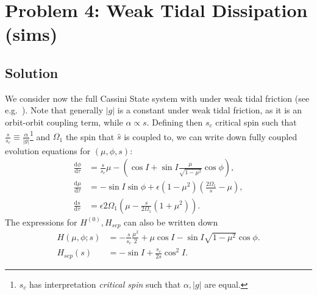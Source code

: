 \documentclass[
        fleqn,
        usenatbib,
    ]{mnras}
\newcommand*{\rd}[2]{\frac{\mathrm{d}#1}{\mathrm{d}#2}}
\newcommand*{\abs}[1]{\left|#1\right|}
\newcommand*{\p}[1]{\left(#1\right)}
\begin{document}
\section{Problem 4: Weak Tidal Dissipation (sims)}\label{s:p4}

\subsection{Solution}

We consider now the full Cassini State system with under weak tidal friction
(see e.g.\ \cite{lai2012}). Note that generally $\abs{g}$ is a constant under
weak tidal friction, as it is an orbit-orbit coupling term, while $\alpha
\propto s$. Defining then $s_c$ critical spin such that $\frac{s}{s_c} \equiv
\frac{\alpha}{\abs{g}}$\footnote{$s_c$ has interpretation \emph{critical spin}
such that $\alpha, \abs{g}$ are equal.} and $\Omega_1$ the spin that $\hat{s}$
is coupled to, we can write down fully coupled evolution equations for $(\mu,
\phi, s)$:
\begin{subequations}\label{se:p4_eom}
    \begin{align}
        \rd{\phi}{\tau} &= \frac{s}{s_c}\mu
            - \p{\cos I + \sin I \frac{\mu}{\sqrt{1 - \mu^2}} \cos \phi},\\
        \rd{\mu}{\tau} &= -\sin I \sin \phi +
            \epsilon \p{1 - \mu^2} \p{\frac{2\Omega_1}{s} - \mu},\\
        \rd{s}{\tau}
            &= \epsilon 2\Omega_1 \p{\mu - \frac{s}{2\Omega_1}\p{1 + \mu^2}}.
    \end{align}
\end{subequations}
The expressions for $H^{(0)}, H_{sep}$ can also be written down
\begin{align}
    H(\mu, \phi; s) &= -\frac{s}{s_c}\frac{\mu^2}{2}
        + \mu \cos I - \sin I \sqrt{1 - \mu^2}\cos \phi.\\
    H_{sep}(s) &= -\sin I + \frac{s_c}{2s}\cos^2 I.
\end{align}
\end{document}
